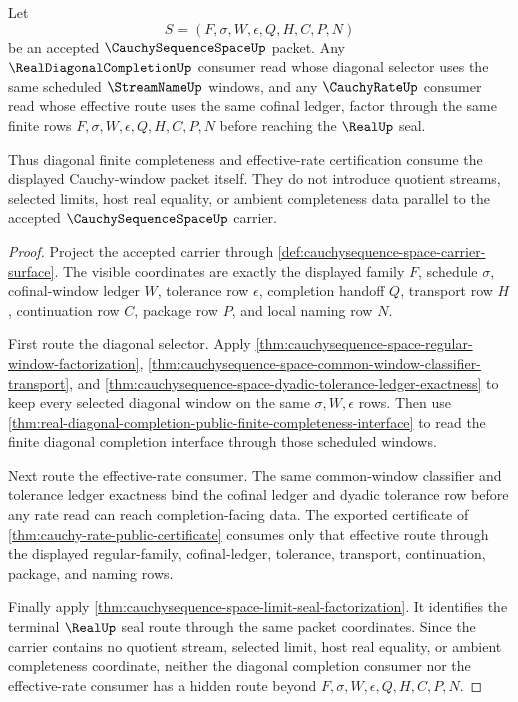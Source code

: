 \begin{theorem}
\label{thm:cauchysequence-space-diagonal-rate-compatibility}
Let
$$
S=(F,\sigma,W,\epsilon,Q,H,C,P,N)
$$
be an accepted $\CauchySequenceSpaceUp$ packet. Any $\RealDiagonalCompletionUp$ consumer read whose diagonal selector uses the same scheduled $\StreamNameUp$ windows, and any $\CauchyRateUp$ consumer read whose effective route uses the same cofinal ledger, factor through the same finite rows $F,\sigma,W,\epsilon,Q,H,C,P,N$ before reaching the $\RealUp$ seal.

Thus diagonal finite completeness and effective-rate certification consume the displayed Cauchy-window packet itself. They do not introduce quotient streams, selected limits, host real equality, or ambient completeness data parallel to the accepted $\CauchySequenceSpaceUp$ carrier.
\end{theorem}
\begin{proof}
Project the accepted carrier through \autoref{def:cauchysequence-space-carrier-surface}. The visible coordinates are exactly the displayed family $F$, schedule $\sigma$, cofinal-window ledger $W$, tolerance row $\epsilon$, completion handoff $Q$, transport row $H$, continuation row $C$, package row $P$, and local naming row $N$.

First route the diagonal selector. Apply \autoref{thm:cauchysequence-space-regular-window-factorization}, \autoref{thm:cauchysequence-space-common-window-classifier-transport}, and \autoref{thm:cauchysequence-space-dyadic-tolerance-ledger-exactness} to keep every selected diagonal window on the same $\sigma,W,\epsilon$ rows. Then use \autoref{thm:real-diagonal-completion-public-finite-completeness-interface} to read the finite diagonal completion interface through those scheduled windows.

Next route the effective-rate consumer. The same common-window classifier and tolerance ledger exactness bind the cofinal ledger and dyadic tolerance row before any rate read can reach completion-facing data. The exported certificate of \autoref{thm:cauchy-rate-public-certificate} consumes only that effective route through the displayed regular-family, cofinal-ledger, tolerance, transport, continuation, package, and naming rows.

Finally apply \autoref{thm:cauchysequence-space-limit-seal-factorization}. It identifies the terminal $\RealUp$ seal route through the same packet coordinates. Since the carrier contains no quotient stream, selected limit, host real equality, or ambient completeness coordinate, neither the diagonal completion consumer nor the effective-rate consumer has a hidden route beyond $F,\sigma,W,\epsilon,Q,H,C,P,N$.
\end{proof}

